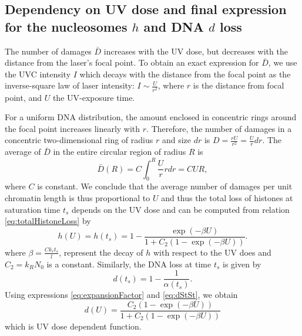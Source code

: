 \documentclass[12pt]{article}
\begin{document}
\subsection{Dependency on UV dose and final expression for the nucleosomes $h$ and DNA $d$ loss}
The number of damages $\bar{D}$ increases with the UV dose, but decreases with the distance from the laser's focal point. To obtain an exact expression for $\bar{D}$, we use the UVC intensity $I$ which decays with the distance from the focal point as the inverse-square law of laser intensity: $I \sim \frac{U}{r^2}$, where $r$ is the distance from focal point, and $U$ the UV-exposure time.

For a uniform DNA distribution, the amount enclosed in concentric rings around the focal point increases linearly with $r$. Therefore, the number of damages in a concentric two-dimensional ring of radius $r$ and size $dr$ is ${D}= \frac{rU}{r^2}=\frac{U}{r}dr$. The average of $\bar{D}$ in the entire circular region of radius $R$ is
\begin{equation*}
\bar{D}(R) = C\int_0^R \frac{U}{r} rdr = CUR,
\end{equation*}
where $C$ is constant. We conclude that the average number of damages per unit chromatin length is thus proportional to $U$ and thus the total loss of histones at saturation time $t_{s}$ depends on the UV dose and can be computed from relation \ref{eq:totalHistoneLoss} by
\begin{equation}\label{eq:totalHiostoneLossVsUV}
h(U)=h(t_s)=1-\frac{\exp(-\beta U)}{ 1+C_2(1-\exp(-\beta U))}.
\end{equation}
where $\beta=\frac{Ck_rt_s}{l}$, represent the decay of $h$ with respect to the UV does and $C_2=k_RN_0$ is a constant. Similarly, the DNA loss at time $t_{s}$ is given by
\begin{equation}\label{eq:dStSt}
d(t_s)= 1-\frac{1}{\alpha(t_s)}.
\end{equation}
Using expressions \ref{eq:expansionFactor} and \ref{eq:dStSt}, we obtain
\begin{equation}\label{eq:dnaLoss}
d(U)= \frac{C_2(1-\exp(-\beta U))}{1+C_2(1-\exp(-\beta U))}
\end{equation}
which is UV dose dependent function.

\end{document}
